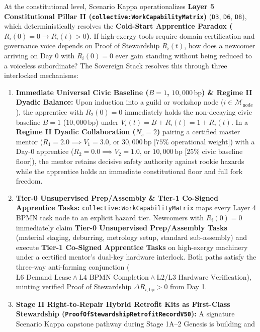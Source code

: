 At the constitutional level, Scenario Kappa operationalizes \textbf{Layer 5 Constitutional
Pillar II (\texttt{collective:WorkCapabilityMatrix})} (\texttt{D3}, \texttt{D6}, \texttt{D8}),
which deterministically resolves the \textbf{Cold-Start Apprentice Paradox ($R_i(0) = 0 \to R_i(t) > 0$)}.
If high-exergy tools require domain certification and governance voice depends on Proof of
Stewardship $R_i(t)$, how does a newcomer arriving on Day 0 with $R_i(0) = 0$ ever gain
standing without being reduced to a voiceless subordinate? The Sovereign Stack resolves this
through three interlocked mechanisms:
\begin{enumerate}
    \item \textbf{Immediate Universal Civic Baseline ($B = 1$, $10{,}000\,\mathrm{bp}$) \& Regime II Dyadic Balance:}
    Upon induction into a guild or workshop node ($i \in \mathcal{M}_{\mathrm{node}}$), the
    apprentice with $R_2(0) = 0$ immediately holds the non-decaying civic baseline
    $B = 1$ ($10{,}000\,\mathrm{bp}$) under $V_i(t) = B + R_i(t) = 1 + R_i(t)$. In a
    \textbf{Regime II Dyadic Collaboration ($N_s = 2$)} pairing a certified master mentor
    ($R_1 = 2.0 \implies V_1 = 3.0$, or $30{,}000\,\mathrm{bp}$ [$75\%$ operational weight])
    with a Day-0 apprentice ($R_2 = 0.0 \implies V_2 = 1.0$, or $10{,}000\,\mathrm{bp}$ [$25\%$
    civic baseline floor]), the mentor retains decisive safety authority against rookie hazards
    while the apprentice holds an immediate constitutional floor and full fork freedom.
    \item \textbf{Tier-0 Unsupervised Prep/Assembly \& Tier-1 Co-Signed Apprentice Tasks:}
    \texttt{collective:WorkCapabilityMatrix} maps every Layer 4 BPMN task node to an explicit
    hazard tier. Newcomers with $R_i(0) = 0$ immediately claim \textbf{Tier-0 Unsupervised
    Prep/Assembly Tasks} (material staging, deburring, metrology setup, standard sub-assembly)
    and execute \textbf{Tier-1 Co-Signed Apprentice Tasks} on high-exergy machinery under a
    certified mentor's dual-key hardware interlock. Both paths satisfy the three-way
    anti-farming conjunction ($\text{L6 Demand Lease} \land \text{L4 BPMN Completion} \land
    \text{L2/L3 Hardware Verification}$), minting verified Proof of Stewardship
    $\Delta R_{i,\mathrm{bp}} > 0$ from Day 1.
    \item \textbf{Stage II Right-to-Repair Hybrid Retrofit Kits as First-Class Stewardship (\texttt{ProofOfStewardshipRetrofitRecordV50}):}
    A signature Scenario Kappa capstone pathway during Stage 1A--2 Genesis is building and

\end{enumerate}
